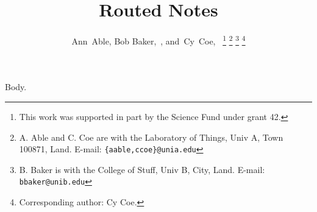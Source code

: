 \documentclass[journal]{IEEEtran}
\begin{document}
\title{Routed Notes}
\author{Ann~Able, Bob Baker,~,
        and~Cy~Coe,~%
\thanks{This work was supported in part by the Science Fund under grant 42.}
\thanks{A. Able and C. Coe are with the Laboratory of Things, Univ A, Town 100871, Land.
E-mail: \tt \{aable,ccoe\}@unia.edu}
\thanks{B. Baker is with the College of Stuff, Univ B, City, Land.
E-mail: {\tt bbaker@unib.edu}}
\thanks{Corresponding author: Cy Coe.}}
\maketitle
Body.
\end{document}
